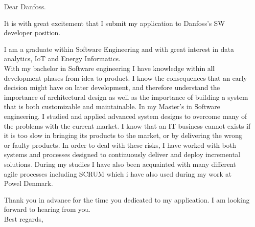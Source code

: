 \documentclass[12pt,a4paper]{altacv}
\begin{document}


\makecvheader



Dear Danfoss.
\\
\vspace{5mm}

It is with great excitement that I submit my application to Danfoss's SW developer position.
\newline

I am a graduate within Software Engineering and with great interest in data analytics, IoT and Energy Informatics.
\\
With my bachelor in Software engineering I have knowledge within all development phases from idea to product.
I know the consequences that an early decision might have on later development, and therefore understand the importance of architectural design as well as the importance of building a system that is both customizable and maintainable.
In my Master's in Software engineering, I studied and applied advanced system designs to overcome many of the problems with the current market.
I know that an IT business cannot exists if it is too slow in bringing its products to the market, or by delivering the wrong or faulty products.
In order to deal with these risks, I have worked with both systems and processes designed to continuously deliver and deploy incremental solutions.
During my studies I have also been acquainted with many different agile processes including SCRUM which i have also used during my work at Powel Denmark.



\vspace{5mm}
Thank you in advance for the time you dedicated to my application. I am looking forward to hearing from you.
\\
\vspace{5mm}
Best regards,\\
\end{document}
